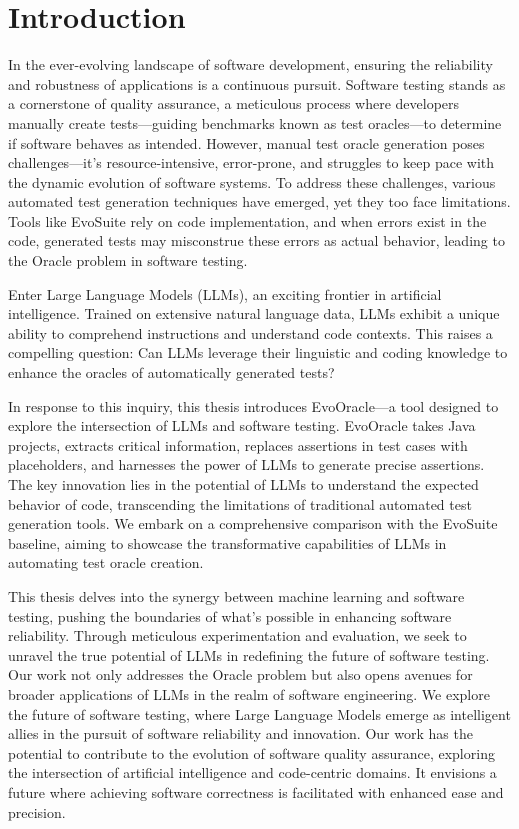 \chapter{Introduction}
\label{cha:introduction}
\vspace{0.4 cm}

In the ever-evolving landscape of software development, ensuring the reliability and robustness of applications is a continuous pursuit. Software testing stands as a cornerstone of quality assurance, a meticulous process where developers manually create tests—guiding benchmarks known as test oracles—to determine if software behaves as intended. However, manual test oracle generation poses challenges\cite{}—it's resource-intensive, error-prone, and struggles to keep pace with the dynamic evolution of software systems. To address these challenges, various automated test generation techniques\cite{} have emerged, yet they too face limitations\cite{}. Tools like EvoSuite\cite{noauthor_evosuite_nodate} rely on code implementation, and when errors exist in the code, generated tests may misconstrue these errors as actual behavior, leading to the Oracle problem in software testing.

Enter Large Language Models (LLMs)\cite{}, an exciting frontier in artificial intelligence. Trained on extensive natural language data, LLMs exhibit a unique ability to comprehend instructions and understand code contexts. This raises a compelling question: Can LLMs leverage their linguistic and coding knowledge to enhance the oracles of automatically generated tests?

In response to this inquiry, this thesis introduces EvoOracle—a tool designed to explore the intersection of LLMs and software testing. EvoOracle takes Java projects, extracts critical information, replaces assertions in test cases with placeholders, and harnesses the power of LLMs to generate precise assertions. The key innovation lies in the potential of LLMs to understand the expected behavior of code, transcending the limitations of traditional automated test generation tools. We embark on a comprehensive comparison with the EvoSuite baseline, aiming to showcase the transformative capabilities of LLMs in automating test oracle creation.

This thesis delves into the synergy between machine learning and software testing, pushing the boundaries of what's possible in enhancing software reliability. Through meticulous experimentation and evaluation, we seek to unravel the true potential of LLMs in redefining the future of software testing. Our work not only addresses the Oracle problem but also opens avenues for broader applications of LLMs in the realm of software engineering. We explore the future of software testing, where Large Language Models emerge as intelligent allies in the pursuit of software reliability and innovation. Our work has the potential to contribute to the evolution of software quality assurance, exploring the intersection of artificial intelligence and code-centric domains. It envisions a future where achieving software correctness is facilitated with enhanced ease and precision.

